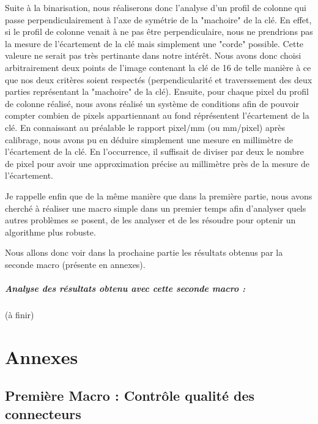 \documentclass{scrreprt}
\begin{document}
Suite à la binarisation, nous réaliserons donc l'analyse d'un profil de colonne qui passe perpendiculairement à l'axe de symétrie 
de la "machoire" de la clé. En effet, si le profil de colonne venait à ne pas être perpendiculaire, nous ne prendrions pas la mesure 
de l'écartement de la clé mais simplement une "corde" possible. Cette valeure ne serait pas très pertinante dans notre intérêt. 
Nous avons donc choisi arbitrairement deux points de l'image contenant la clé de 16 de telle manière à ce que nos deux critères soient respectés
(perpendicularité et traverssement des deux parties représentant la "machoire" de la clé). Ensuite, pour chaque pixel du profil de colonne réalisé, 
nous avons réalisé un système de conditions afin de pouvoir compter combien de pixels appartiennant au fond réprésentent l'écartement de la clé. 
En connaissant au préalable le rapport pixel/mm (ou mm/pixel) après calibrage, nous avons pu en déduire simplement une mesure en millimètre de
l'écartement de la clé. En l'occurrence, il suffisait de diviser par deux le nombre de pixel pour avoir une approximation précise au millimètre près 
de la mesure de l'écartement.    

Je rappelle enfin que de la même manière que dans la première partie, nous avons cherché à réaliser une macro simple dans un premier temps
afin d'analyser quels autres problèmes se posent, de les analyser et de les résoudre pour optenir un algorithme plus robuste. 

Nous allons donc voir dans la prochaine partie les résultats obtenus par la seconde macro (présente en annexes). 

\paragraph{Analyse des résultats obtenu avec cette seconde macro : }

(à finir)

\chapter{Annexes}

\section{Première Macro : Contrôle qualité des connecteurs}
\end{document}

